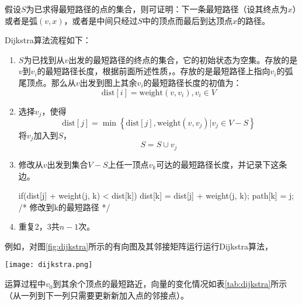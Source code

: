假设$S$为已求得最短路径的点的集合，则可证明：下一条最短路径（设其终点为$x$）或者是弧$(v, x)$，或者是中间只经过$S$中的顶点而最后到达顶点$x$的路径。

Dijkstra算法流程如下：
\begin{enumerate}
\item $S$为已找到从$v$出发的最短路径的终点的集合，它的初始状态为空集。存放的是$v$到$v_i$的最短路径长度，根据前面所述性质，。存放的是最短路径上指向$v_i$的弧尾顶点。那么从$v$出发到图上其余$v_i$的最短路径长度的初值为：
$$
\text{dist}[i] = \text{weight}(v, v_i), v_i \in V
$$
\item 选择$v_j$，使得
$$
\text{dist}[j]=\min\left\{\text{dist}[j], \text{weight}(v, v_j)|v_j \in V-S\right\}
$$
将$v_j$加入到$S$，
$$
S = S \cup {v_j}
$$
\item 修改从$v$出发到集合$V-S$上任一顶点$v_k$可达的最短路径长度，并记录下这条边。
\begin{Code}
if(dist[j] + weight(j, k) < dist[k]) {
    dist[k] = dist[j] + weight(j, k);
    path[k] = j; /* 修改到k的最短路径 */
}
\end{Code}
\item 重复2，3共$n-1$次。
\end{enumerate}

例如，对图\ref{fig:dijkstra}所示的有向图及其邻接矩阵运行运行Dijkstra算法，

\begin{center}
\texttt{[image: dijkstra.png]}\\
\label{fig:dijkstra}
\end{center}

运算过程中$v_0$到其余个顶点的最短路近，向量的变化情况如表\ref{tab:dijkstra}所示（从一列到下一列只需要更新新加入点的邻接点）。

